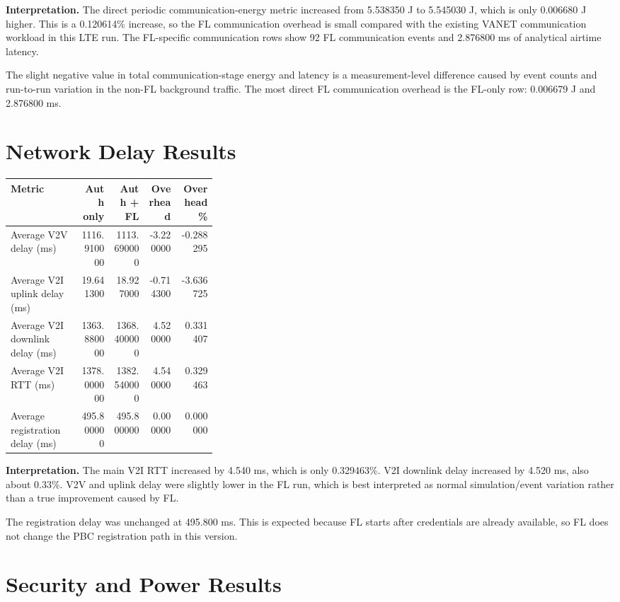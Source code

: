 \documentclass[11pt,a4paper]{article}
\begin{document}
\textbf{Interpretation.} The direct periodic communication-energy metric
increased from 5.538350 J to 5.545030 J, which is only 0.006680 J higher. This
is a 0.120614\% increase, so the FL communication overhead is small compared
with the existing VANET communication workload in this LTE run. The FL-specific
communication rows show 92 FL communication events and 2.876800 ms of analytical
airtime latency.

The slight negative value in total communication-stage energy and latency is a
measurement-level difference caused by event counts and run-to-run variation in
the non-FL background traffic. The most direct FL communication overhead is the
FL-only row: 0.006679 J and 2.876800 ms.

\section{Network Delay Results}

\begin{longtable}{p{0.34\linewidth}rrrr}
\toprule
\textbf{Metric} & \textbf{Auth only} & \textbf{Auth + FL} & \textbf{Overhead} & \textbf{Overhead \%} \\
\midrule
Average V2V delay (ms) & 1116.910000 & 1113.690000 & -3.220000 & -0.288295 \\
Average V2I uplink delay (ms) & 19.641300 & 18.927000 & -0.714300 & -3.636725 \\
Average V2I downlink delay (ms) & 1363.880000 & 1368.400000 & 4.520000 & 0.331407 \\
Average V2I RTT (ms) & 1378.000000 & 1382.540000 & 4.540000 & 0.329463 \\
Average registration delay (ms) & 495.800000 & 495.800000 & 0.000000 & 0.000000 \\
\bottomrule
\end{longtable}

\textbf{Interpretation.} The main V2I RTT increased by 4.540 ms, which is only
0.329463\%. V2I downlink delay increased by 4.520 ms, also about 0.33\%. V2V
and uplink delay were slightly lower in the FL run, which is best interpreted
as normal simulation/event variation rather than a true improvement caused by
FL.

The registration delay was unchanged at 495.800 ms. This is expected because FL
starts after credentials are already available, so FL does not change the PBC
registration path in this version.

\section{Security and Power Results}
\end{document}
